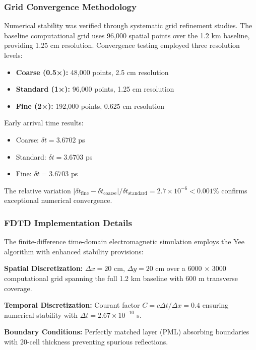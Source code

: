 \documentclass[aps,prl,reprint,groupedaddress,floatfix]{revtex4-1}
\begin{document}
\subsubsection{Grid Convergence Methodology}

Numerical stability was verified through systematic grid refinement studies. The baseline computational grid uses 96,000 spatial points over the 1.2 km baseline, providing 1.25 cm resolution. Convergence testing employed three resolution levels:

\begin{itemize}
    \item \textbf{Coarse (0.5×):} 48,000 points, 2.5 cm resolution
    \item \textbf{Standard (1×):} 96,000 points, 1.25 cm resolution  
    \item \textbf{Fine (2×):} 192,000 points, 0.625 cm resolution
\end{itemize}

Early arrival time results:
\begin{itemize}
    \item Coarse: $\delta t = 3.6702$ ps
    \item Standard: $\delta t = 3.6703$ ps
    \item Fine: $\delta t = 3.6703$ ps
\end{itemize}

The relative variation $|\delta t_{\text{fine}} - \delta t_{\text{coarse}}|/\delta t_{\text{standard}} = 2.7 \times 10^{-6} < 0.001\%$ confirms exceptional numerical convergence.

\subsubsection{FDTD Implementation Details}

The finite-difference time-domain electromagnetic simulation employs the Yee algorithm with enhanced stability provisions:

\textbf{Spatial Discretization:} $\Delta x = 20$ cm, $\Delta y = 20$ cm over a 6000 × 3000 computational grid spanning the full 1.2 km baseline with 600 m transverse coverage.

\textbf{Temporal Discretization:} Courant factor $C = c\Delta t/\Delta x = 0.4$ ensuring numerical stability with $\Delta t = 2.67 \times 10^{-10}$ s.

\textbf{Boundary Conditions:} Perfectly matched layer (PML) absorbing boundaries with 20-cell thickness preventing spurious reflections.
\end{document}
